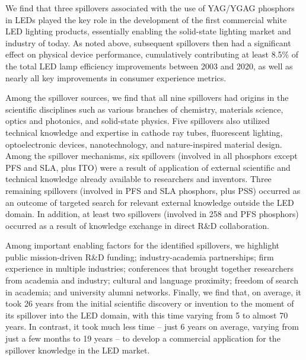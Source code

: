 \documentclass[parskip=full]{article}
\begin{document}
We find that three spillovers associated with the use of YAG/YGAG phosphors in LEDs played the key role in the development of the first commercial white LED lighting products, essentially enabling the solid-state lighting market and industry of today. As noted above, subsequent spillovers then had a significant effect on physical device performance, cumulatively contributing at least 8.5\% of the total LED lamp efficiency improvements between 2003 and 2020, as well as nearly all key improvements in consumer experience metrics.

Among the spillover sources, we find that all nine spillovers had origins in the scientific disciplines such as various branches of chemistry, materials science, optics and photonics, and solid-state physics. Five spillovers also utilized technical knowledge and expertise in cathode ray tubes, fluorescent lighting, optoelectronic devices, nanotechnology, and nature-inspired material design.
Among the spillover mechanisms, six spillovers (involved in all phosphors except PFS and SLA, plus ITO) were a result of application of external scientific and technical knowledge already available to researchers and inventors. Three remaining spillovers (involved in PFS and SLA phosphors, plus PSS) occurred as an outcome of targeted search for relevant external knowledge outside the LED domain. In addition, at least two spillovers (involved in 258 and PFS phosphors) occurred as a result of knowledge exchange in direct R\&D collaboration.

Among important enabling factors for the identified spillovers, we highlight public mission-driven R\&D funding; industry-academia partnerships; firm experience in multiple industries; conferences that brought together researchers from academia and industry; cultural and language proximity; freedom of search in academia; and university alumni networks.
Finally, we find that, on average, it took 26 years from the initial scientific discovery or invention to the moment of its spillover into the LED domain, with this time varying from 5 to almost 70 years. In contrast, it took much less time – just 6 years on average, varying from just a few months to 19 years – to develop a commercial application for the spillover knowledge in the LED market.
\end{document}
